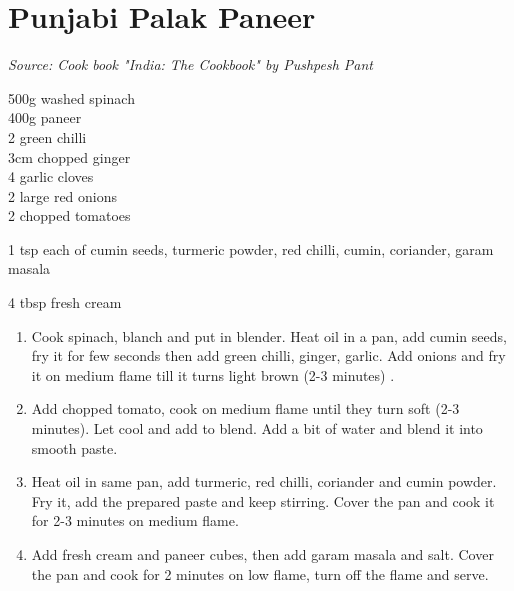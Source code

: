 \documentclass{report}
\begin{document}
\section{Punjabi Palak Paneer}
\textit{Source: Cook book "India: The Cookbook" by Pushpesh Pant}\\
\begin{minipage}[t]{0.21\textwidth} \vspace{0pt} 
500g washed spinach \\
400g paneer\\
2 green chilli\\
3cm chopped ginger\\
4 garlic cloves\\
2 large red onions\\
2 chopped tomatoes
\begin{flushleft}
1 tsp each of cumin seeds, turmeric powder, red chilli, cumin, coriander, garam masala\\ 
\end{flushleft}
4 tbsp fresh cream
\end{minipage}
\hfill
\begin{minipage}[t]{0.78\textwidth} \vspace{0pt}
	\begin{enumerate}
		\item Cook spinach, blanch and put in blender. Heat oil in a pan, add cumin seeds, fry it for few seconds then add green chilli, ginger, garlic. Add onions and fry it on medium flame till it turns light brown (2-3 minutes) . 
		\item Add chopped tomato, cook on medium flame until they turn  soft (2-3 minutes). Let cool and add to blend. Add a bit of water and blend it into smooth paste. 
		\item Heat oil in same pan, add turmeric, red chilli, coriander and cumin powder. Fry it, add the prepared paste and keep stirring. Cover the pan and cook it for 2-3 minutes on medium flame. 
		\item Add fresh cream and paneer cubes, then add garam masala and salt. Cover the pan and cook for 2 minutes on low flame, turn off the flame and serve.
	\end{enumerate}	
\end{minipage}
\end{document}
